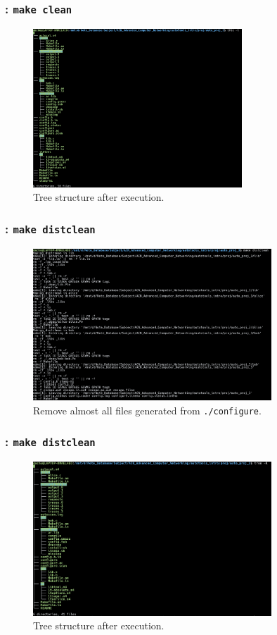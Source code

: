 \begin{frame}
    \frametitle{: \texttt{make clean}}

    \begin{figure}[H]
        \centering
        \includegraphics[width=0.7\textwidth]{../figure/autotool_11.png}
        \caption*{Tree structure after execution.}
    \end{figure}
\end{frame}

\begin{frame}
    \frametitle{: \texttt{make distclean}}

    \begin{figure}[H]
        \centering
        \includegraphics[width=0.8\textwidth]{../figure/autotool_12.png}
        \caption*{Remove almost all files generated from \texttt{./configure}.}
    \end{figure}
\end{frame}

\begin{frame}
    \frametitle{: \texttt{make distclean}}

    \begin{figure}[H]
        \centering
        \includegraphics[width=0.8\textwidth]{../figure/autotool_13.png}
        \caption*{Tree structure after execution.}
    \end{figure}
\end{frame}
